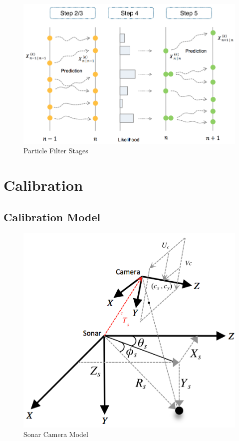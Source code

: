 \documentclass[15pt]{article}
\begin{document}
\begin{figure}[h!]
  \centering
  \includegraphics[scale=0.3]{resample}
  \captionsetup{justification=centering}
  \caption{Particle Filter Stages}
\end{figure}

\section{Calibration}

\subsection{Calibration Model}

\begin{figure}[h!]
  \centering
  \includegraphics[scale=0.4]{sonarcamframe}
  \captionsetup{justification=centering}
  \caption{Sonar Camera Model}
\end{figure}
\end{document}
